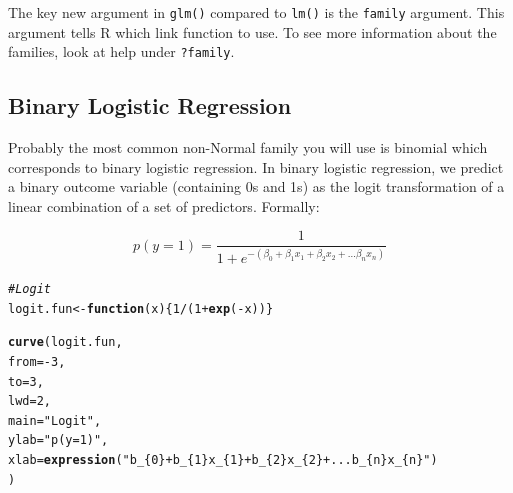 \documentclass{tufte-book}\usepackage[]{graphicx}\usepackage[]{color}
\makeatletter
\newcommand{\hlnum}[1]{\textcolor[rgb]{0.686,0.059,0.569}{#1}}%
\newcommand{\hlstr}[1]{\textcolor[rgb]{0.192,0.494,0.8}{#1}}%
\newcommand{\hlcom}[1]{\textcolor[rgb]{0.678,0.584,0.686}{\textit{#1}}}%
\newcommand{\hlopt}[1]{\textcolor[rgb]{0,0,0}{#1}}%
\newcommand{\hlstd}[1]{\textcolor[rgb]{0.345,0.345,0.345}{#1}}%
\newcommand{\hlkwa}[1]{\textcolor[rgb]{0.161,0.373,0.58}{\textbf{#1}}}%
\newcommand{\hlkwb}[1]{\textcolor[rgb]{0.69,0.353,0.396}{#1}}%
\newcommand{\hlkwc}[1]{\textcolor[rgb]{0.333,0.667,0.333}{#1}}%
\newcommand{\hlkwd}[1]{\textcolor[rgb]{0.737,0.353,0.396}{\textbf{#1}}}%
\newenvironment{kframe}{%
 \def\at@end@of@kframe{}%
 \ifinner\ifhmode%
  \def\at@end@of@kframe{\end{minipage}}%
  \begin{minipage}{\columnwidth}%
 \fi\fi%
 \def\FrameCommand##1{\hskip\@totalleftmargin \hskip-\fboxsep
 \colorbox{shadecolor}{##1}\hskip-\fboxsep
     \hskip-\linewidth \hskip-\@totalleftmargin \hskip\columnwidth}%
 \MakeFramed {\advance\hsize-\width
   \@totalleftmargin\z@ \linewidth\hsize
   \@setminipage}}%
 {\par\unskip\endMakeFramed%
 \at@end@of@kframe}
\newenvironment{knitrout}{}{} %
\makeatother
\begin{document}
\begin{footnotesize}
The key new argument in \texttt{glm()} compared to \texttt{lm()} is the \texttt{family} argument. This argument tells R which link function to use. To see more information about the families, look at help under \texttt{?family}.

\subsection{Binary Logistic Regression}

Probably the most common non-Normal family you will use is binomial which corresponds to binary logistic regression. In binary logistic regression, we predict a binary outcome variable (containing 0s and 1s) as the logit transformation of a linear combination of a set of predictors. Formally:

\begin{Large}
\begin{equation*}
p(y=1)=\frac{1}{1+e^{-(\beta_{0}+\beta_{1}x_{1}+\beta_{2}x_{2}+...\beta_{n}x_{n})}}
\end{equation*}
\end{Large}


\begin{marginfigure}
\begin{tiny}
\begin{knitrout}
\color{fgcolor}\begin{kframe}
\begin{alltt}
\hlcom{# Logit}
\hlstd{logit.fun} \hlkwb{<-} \hlkwa{function}\hlstd{(}\hlkwc{x}\hlstd{) \{}\hlnum{1} \hlopt{/} \hlstd{(}\hlnum{1} \hlopt{+} \hlkwd{exp}\hlstd{(}\hlopt{-}\hlstd{x))\}}

\hlkwd{curve}\hlstd{(logit.fun,}
      \hlkwc{from} \hlstd{=} \hlopt{-}\hlnum{3}\hlstd{,}
      \hlkwc{to} \hlstd{=} \hlnum{3}\hlstd{,}
      \hlkwc{lwd} \hlstd{=} \hlnum{2}\hlstd{,}
      \hlkwc{main} \hlstd{=} \hlstr{"Logit"}\hlstd{,}
      \hlkwc{ylab} \hlstd{=} \hlstr{"p(y = 1)"}\hlstd{,}
      \hlkwc{xlab} \hlstd{=} \hlkwd{expression}\hlstd{(}\hlstr{"b_\{0\} + b_\{1\}x_\{1\} + b_\{2\}x_\{2\} + ... b_\{n\}x_\{n\}"}\hlstd{)}
      \hlstd{)}


\end{alltt}
\end{kframe}
\end{knitrout}
\end{tiny}
\end{marginfigure}
\end{footnotesize}
\end{document}

